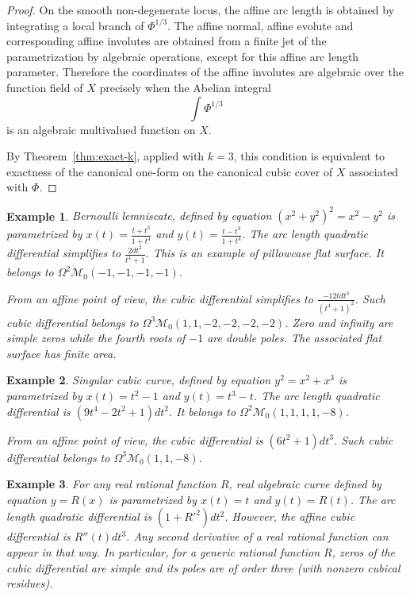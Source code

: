 \documentclass[reqno]{amsart}
\newtheorem{example}{Example}
\theoremstyle{definition}
\theoremstyle{remark}
\theoremstyle{definition}
\theoremstyle{definition}
\theoremstyle{definition}
\begin{document}
\begin{proof}
On the smooth non-degenerate locus, the affine arc length is obtained by
integrating a local branch of $\Phi^{1/3}$. The affine normal, affine evolute
and corresponding affine involutes are obtained from a finite jet of the
parametrization by algebraic operations, except for this affine arc length
parameter. Therefore the coordinates of the affine involutes are algebraic over
the function field of $X$ precisely when the Abelian integral
\[
\int \Phi^{1/3}
\]
is an algebraic multivalued function on $X$.

By Theorem~\ref{thm:exact-k}, applied with $k=3$, this condition is equivalent
to exactness of the canonical one-form on the canonical cubic cover of $X$
associated with $\Phi$.
\end{proof}

\begin{example}
Bernoulli lemniscate, defined by equation $(x^{2}+y^{2})^{2}=x^{2}-y^{2}$ is parametrized by $x(t)=\frac{t+t^{3}}{1+t^{4}}$ and $y(t)=\frac{t-t^{3}}{1+t^{4}}$. The arc length quadratic differential simplifies to $\frac{2dt^{2}}{t^{4}+1}$. This is an example of pillowcase flat surface. It belongs to $\Omega^{2}\mathcal{M}_{0}(-1,-1,-1,-1)$.

From an affine point of view, the cubic differential simplifies to $\frac{-12tdt^{3}}{(t^{4}+1)^{2}}$. Such cubic differential belongs to $\Omega^{3}\mathcal{M}_{0}(1,1,-2,-2,-2,-2)$. Zero and infinity are simple zeros while the fourth roots of $-1$ are double poles. The associated flat surface has finite area.
\end{example}

\begin{example}
Singular cubic curve, defined by equation $y^{2}=x^{2}+x^{3}$ is parametrized by $x(t)=t^{2}-1$ and $y(t)=t^{3}-t$. The arc length quadratic differential is $(9t^{4}-2t^{2}+1)dt^{2}$. It belongs to $\Omega^{2}\mathcal{M}_{0}(1,1,1,1,-8)$.

From an affine point of view, the cubic differential is $(6t^{2}+1)dt^{3}$. Such cubic differential belongs to $\Omega^{3}\mathcal{M}_{0}(1,1,-8)$.
\end{example}

\begin{example}
For any real rational function $R$, real algebraic curve defined by equation $y=R(x)$ is parametrized by $x(t)=t$ and $y(t)=R(t)$. The arc length quadratic differential is $(1+R'^{2})dt^{2}$. However, the affine cubic differential is $R''(t)dt^{3}$. Any second derivative of a real rational function can appear in that way. In particular, for a generic rational function $R$, zeros of the cubic differential are simple and its poles are of order three (with nonzero cubical residues).
\end{example}
\end{document}
